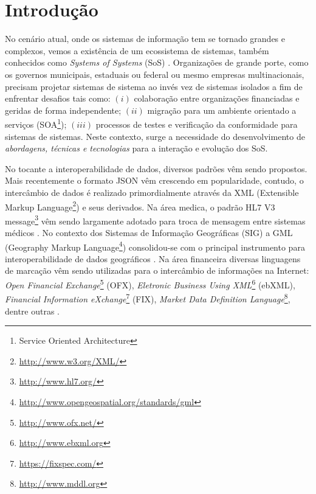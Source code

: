 \documentclass[msc,proposal,hidelot,hideabstract]{ppgccufmg} %
\begin{document}
\chapter{Introdução}
\label{ch:Contexto}
No cenário atual, onde os sistemas de informação tem se tornado grandes e complexos, vemos a existência de um ecossistema de sistemas, também conhecidos como \textit{Systems of Systems} (SoS) \cite{Nakagawa:2013:SAF:2489850.2489853}. Organizações de grande porte, como os governos municipais, estaduais ou federal ou mesmo empresas multinacionais, precisam projetar sistemas de sistema ao invés vez de sistemas isolados a fim de enfrentar desafios tais como: $(i)$ colaboração entre organizações financiadas e geridas de forma independente; $(ii)$ migração para um ambiente orientado a serviços (SOA\footnote{Service Oriented Architecture }); $(iii)$ processos de testes e verificação da conformidade para sistemas de sistemas. Neste contexto, surge a necessidade do desenvolvimento de \textit{abordagens, técnicas e tecnologias} para a interação e evolução dos SoS.
     
No tocante a interoperabilidade de dados, diversos padrões vêm sendo propostos. Mais recentemente o formato JSON \cite{RFC4627} vêm crescendo em popularidade, contudo, o intercâmbio de dados é realizado primordialmente através da XML (Extensible Markup Language\footnote{\url{http://www.w3.org/XML/}}) e seus derivados. Na área medica, o padrão HL7 V3 message\footnote{\url{http://www.hl7.org/}} vêm sendo largamente adotado para troca de mensagem entre sistemas médicos \cite{Andrikopoulos:2013:TEO:2491845.2491890}{}. No contexto dos Sistemas de Informação Geográficas (SIG) a GML (Geography Markup Language\footnote{\url{http://www.opengeospatial.org/standards/gml}}) consolidou-se com o principal instrumento para interoperabilidade de dados geográficos \cite{gmlpaper}{}. Na área financeira diversas linguagens de marcação vêm sendo utilizadas para o intercâmbio de informações na Internet: \textit{Open Financial Exchange}\footnote{\url{http://www.ofx.net/}} (OFX), \textit{Eletronic Business Using XML}\footnote{\url{http://www.ebxml.org}} (ebXML), \textit{Financial Information eXchange}\footnote{\url{https://fixspec.com/}} (FIX), \textit{Market Data Definition Language}\footnote{\url{http://www.mddl.org}}, dentre outras \cite{xbrl_conceitos_aplicacoes}{}.
\end{document}
